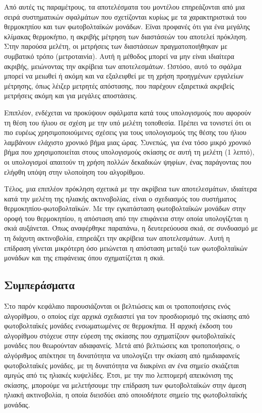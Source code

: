 \documentclass[12pt, a4paper]{report} %
\begin{document}
Από αυτές τις παραμέτρους, τα αποτελέσματα του μοντέλου επηρεάζονται από μια σειρά συστηματικών σφαλμάτων που σχετίζονται 
κυρίως με τα χαρακτηριστικά του θερμοκηπίου και των φωτοβολταϊκών μονάδων. Είναι προφανές ότι για ένα μεγάλης κλίμακας 
θερμοκήπιο, η ακριβής μέτρηση των διαστάσεών του αποτελεί πρόκληση. Στην παρούσα μελέτη, οι μετρήσεις των διαστάσεων 
πραγματοποιήθηκαν με συμβατικό τρόπο (μετροταινία). Αυτή η μέθοδος μπορεί να μην είναι ιδιαίτερα ακριβής, μειώνοντας την 
ακρίβεια των αποτελεσμάτων. Ωστόσο, αυτό το σφάλμα μπορεί να μειωθεί ή ακόμη και να εξαλειφθεί με τη χρήση προηγμένων 
εργαλείων μέτρησης, όπως λέιζερ μετρητές απόστασης, που παρέχουν εξαιρετικά ακριβείς μετρήσεις ακόμη και για μεγάλες αποστάσεις.

Επιπλέον, ενδέχεται να προκύψουν σφάλματα κατά τους υπολογισμούς που αφορούν τη θέση του ήλιου σε σχέση με την υπό μελέτη 
τοποθεσία. Πρέπει να τονιστεί ότι οι πιο ευρέως χρησιμοποιούμενες σχέσεις για τους υπολογισμούς της θέσης του ήλιου λαμβάνουν 
ελάχιστο χρονικό βήμα μιας ώρας. Συνεπώς, για ένα τόσο μικρό χρονικό βήμα που χρησιμοποιείται στους υπολογισμούς σκίασης 
σε αυτή τη μελέτη (1 λεπτό), οι υπολογισμοί απαιτούν τη χρήση πολλών δεκαδικών ψηφίων, ένας παράγοντας που ελήφθη υπόψη στην 
υλοποίηση του αλγορίθμου.

Τέλος, μια επιπλέον πρόκληση σχετικά με την ακρίβεια των αποτελεσμάτων, ιδιαίτερα κατά την μελέτη της ηλιακής ακτινοβολίας, 
είναι ο σχεδιασμός του συστήματος θερμοκηπίου-φωτοβολταϊκών. Με την εγκατάσταση φωτοβολταϊκών μονάδων στην οροφή του 
θερμοκηπίου, η απόσταση από την επιφάνεια στην οποία υπολογίζεται η σκιά αυξάνεται. Όπως αναφέρθηκε παραπάνω, η δευτερεύουσα 
σκιά, σε συνδυασμό με τη διάχυτη ακτινοβολία, επηρεάζει την ακρίβεια των αποτελεσμάτων. Αυτή η επίδραση γίνεται μικρότερη 
όσο μειώνεται η απόσταση μεταξύ των φωτοβολταϊκών μονάδων και της επιφάνειας όπου σχηματίζεται η σκιά.

\subsection{Συμπεράσματα}\label{sub_alg_advanc_concl}

Στο παρόν κεφάλαιο παρουσιάζονται οι βελτιώσεις και οι τροποποιήσεις ενός αλγορίθμου, ο οποίος είχε αρχικά σχεδιαστεί για τον 
προσδιορισμό της σκίασης από φωτοβολταϊκές μονάδες ενσωματωμένες σε θερμοκήπια. Η αρχική έκδοση του αλγορίθμου στόχευε στην 
εύρεση της σκίασης που σχηματίζουν φωτοβολταϊκές μονάδες που θεωρούνταν αδιαφανείς. Μετά από βελτιώσεις και τροποποιήσεις, ο 
αλγόριθμος απέκτησε τη δυνατότητα να υπολογίζει την σκίαση από ημιδιαφανείς φωτοβολταϊκές μονάδες, με τη δυνατότητα να 
διακρίνει αν ένα σημείο σκιάζεται αμιγώς από τις ηλιακές κυψελίδες. Έτσι, με την πιο λεπτομερή απεικόνιση της σκίασης, 
μπορούμε να μελετήσουμε την επίδραση των φωτοβολταϊκών στην άμεση ηλιακή ακτινοβολία, η οποία διεισδύει από οποιοδήποτε 
σημείο της φωτοβολταϊκής μονάδας.
\end{document}
